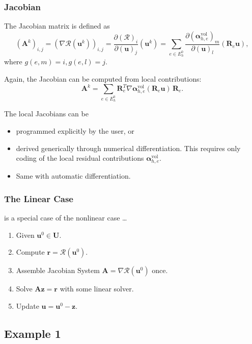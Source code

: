 \begin{frame}
\frametitle{Jacobian}
The Jacobian matrix is defined as
\begin{equation*}
(\mathbf{A}^k)_{i,j} = (\nabla\mathcal{R}(\mathbf{u}^k))_{i,j} 
= \frac{\partial (\mathcal{R})_i}{\partial (\mathbf{u})_j}(\mathbf{u}^k)
= \sum_{e\in E_h^0} \frac{\partial (\bm{\alpha}_{h,e}^{\text{vol}})_m }{\partial (\mathbf{u})_l } (\mathbf{R}_e \mathbf{u}),
\end{equation*}
where $g(e,m)=i, g(e,l)=j$.

Again, the Jacobian can be computed from local contributions:
\begin{equation*}
\mathbf{A}^k = \sum_{e\in E_h^0} \mathbf{R}_e^T \nabla\bm{\alpha}_{h,e}^{\text{vol}}(\mathbf{R}_e \mathbf{u}) \, \mathbf{R}_e.
\end{equation*}

The local Jacobians can be
\begin{itemize}
\item programmed explicitly by the user, or
\item derived generically through numerical differentiation. This requires only coding
of the local residual contributions $\bm{\alpha}_{h,e}^{\text{vol}}$.
\item Same with automatic differentiation.
\end{itemize}
\end{frame}


\begin{frame}
\frametitle{The Linear Case}
is a special case of the nonlinear case \ldots
\begin{enumerate}
\item Given $\mathbf{u}^0\in\mathbf{U}$.
\item Compute $\mathbf{r} = \mathcal{R}(\mathbf{u}^0)$.
\item Assemble Jacobian System $\mathbf{A} = \nabla\mathcal{R}(\mathbf{u}^0)$ once.
\item Solve $\mathbf{A} \mathbf{z} = \mathbf{r}$ with some linear solver.
\item Update $\mathbf{u} = \mathbf{u}^{0} - \mathbf{z}$.
\end{enumerate}
\end{frame}

\subsection{Example 1}

